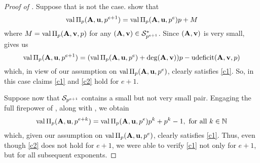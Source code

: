 \documentclass{amsart}
\begin{document}
\begin{proof}[Proof of ]
   Suppose that is not the case.
    show that
   \begin{equation}
      \label{recurrence: E}
      \val \IP_p(\matA,\vv{u},p^{e+1}) = \val \IP_p(\matA,\vv{u},p^e)p + M
   \end{equation}
   where $M = \val\IP_p(\matA,\vv{v},p)$ for any  $(\matA,\vv{v}) \in \S^*_{p^{e+1}}$.
   Since $(\matA,\vv{v})$ is very small,  gives us
   \[\val \IP_p(\matA,\vv{u},p^{e+1}) = (\val \IP_p(\matA,\vv{u},p^e) + \degree(\matA,\vv{v})) p - \udeficit(\matA,\vv{v},p)\]
   which, in view of our assumption on $\val \IP_p(\matA,\vv{u},p^e)$, clearly satisfies \ref{c1}.
   So, in this case claims \ref{c1} and \ref{c2} hold for $e+1$.

   Suppose now that $\S_{p^{e+1}}$ contains a small but not very small pair.
   Engaging the full firepower of , along with , we obtain
   \begin{equation}
      \label{tail: E}
      \val \IP_p(\matA,\vv{u},p^{e+k}) = \val \IP_p(\matA,\vv{u},p^e)p^k + p^k - 1,\text{ for all }k\in \NN
   \end{equation}
   which, given our assumption on $\val \IP_p(\matA,\vv{u},p^e)$, clearly satisfies \ref{c1}.
   Thus, even though \ref{c2} does not hold for $e+1$, we were able to verify \ref{c1} not only for $e+1$, but for all subsequent exponents.
\end{proof}
\end{document}
